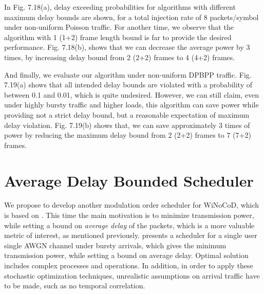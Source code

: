 In Fig. 7.18(a), delay exceeding probabilities for algorithms with different maximum delay bounds are shown, for a total injection rate of 8 packets/symbol under non-uniform Poisson traffic. For another time, we observe that the algorithm with 1 (1+2) frame length bound is far to provide the desired performance. Fig. 7.18(b), shows that we can decrease the average power by 3 times, by increasing delay bound from 2 (2+2) frames to 4 (4+2) frames.



And finally, we evaluate our algorithm under non-uniform DPBPP traffic. Fig. 7.19(a) shows that all intended delay bounds are violated with a probability of between 0.1 and 0.01, which is quite undesired. However, we can still claim, even under highly bursty traffic and higher loads, this algorithm can save power while providing not a strict delay bound, but a reasonable expectation of  maximum delay violation. Fig. 7.19(b) shows that, we can save approximately 3 times of power by reducing the maximum delay bound from 2 (2+2) frames to 7 (7+2) frames. 

  
\section{Average Delay Bounded Scheduler}


We propose to develop another modulation order scheduler for WiNoCoD, which is based on \cite{rajan2004delay}. This time the main motivation is to minimize transmission power, while setting a bound on \textit{average delay} of the packets, which is a more valuable metric of interest, as mentioned previously. \cite{rajan2004delay} presents a scheduler for a single user single AWGN channel under bursty arrivals, which gives the minimum transmission power, while setting a bound on average delay. Optimal solution includes complex processes and operations. In addition, in order to apply these stochastic optimization techniques, unrealistic assumptions on arrival traffic have to be made, such as no temporal correlation. 


